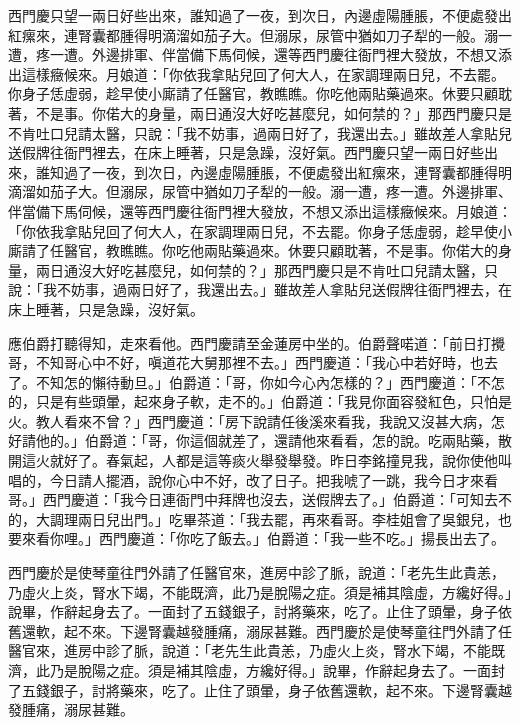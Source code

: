 西門慶只望一兩日好些出來，誰知過了一夜，到次日，內邊虛陽腫脹，不便處發出紅瘰來，連腎囊都腫得明滴溜如茄子大。但溺尿，尿管中猶如刀子犁的一般。溺一遭，疼一遭。外邊排軍、伴當備下馬伺候，還等西門慶往衙門裡大發放，不想又添出這樣癥候來。月娘道：「你依我拿貼兒回了何大人，在家調理兩日兒，不去罷。你身子恁虛弱，趁早使小廝請了任醫官，教瞧瞧。你吃他兩貼藥過來。休要只顧耽著，不是事。你偌大的身量，兩日通沒大好吃甚麼兒，如何禁的？」那西門慶只是不肯吐口兒請太醫，只說：「我不妨事，過兩日好了，我還出去。」雖故差人拿貼兒送假牌往衙門裡去，在床上睡著，只是急躁，沒好氣。西門慶只望一兩日好些出來，誰知過了一夜，到次日，內邊虛陽腫脹，不便處發出紅瘰來，連腎囊都腫得明滴溜如茄子大。但溺尿，尿管中猶如刀子犁的一般。溺一遭，疼一遭。外邊排軍、伴當備下馬伺候，還等西門慶往衙門裡大發放，不想又添出這樣癥候來。月娘道：「你依我拿貼兒回了何大人，在家調理兩日兒，不去罷。你身子恁虛弱，趁早使小廝請了任醫官，教瞧瞧。你吃他兩貼藥過來。休要只顧耽著，不是事。你偌大的身量，兩日通沒大好吃甚麼兒，如何禁的？」那西門慶只是不肯吐口兒請太醫，只說：「我不妨事，過兩日好了，我還出去。」雖故差人拿貼兒送假牌往衙門裡去，在床上睡著，只是急躁，沒好氣。

應伯爵打聽得知，走來看他。西門慶請至金蓮房中坐的。伯爵聲喏道：「前日打攪哥，不知哥心中不好，嗔道花大舅那裡不去。」西門慶道：「我心中若好時，也去了。不知怎的懶待動旦。」伯爵道：「哥，你如今心內怎樣的？」西門慶道：「不怎的，只是有些頭暈，起來身子軟，走不的。」伯爵道：「我見你面容發紅色，只怕是火。教人看來不曾？」西門慶道：「房下說請任後溪來看我，我說又沒甚大病，怎好請他的。」伯爵道：「哥，你這個就差了，還請他來看看，怎的說。吃兩貼藥，散開這火就好了。春氣起，人都是這等痰火舉發舉發。昨日李銘撞見我，說你使他叫唱的，今日請人擺酒，說你心中不好，改了日子。把我唬了一跳，我今日才來看哥。」西門慶道：「我今日連衙門中拜牌也沒去，送假牌去了。」伯爵道：「可知去不的，大調理兩日兒出門。」吃畢茶道：「我去罷，再來看哥。李桂姐會了吳銀兒，也要來看你哩。」西門慶道：「你吃了飯去。」伯爵道：「我一些不吃。」揚長出去了。

西門慶於是使琴童往門外請了任醫官來，進房中診了脈，說道：「老先生此貴恙，乃虛火上炎，腎水下竭，不能既濟，此乃是脫陽之症。須是補其陰虛，方纔好得。」說畢，作辭起身去了。一面封了五錢銀子，討將藥來，吃了。止住了頭暈，身子依舊還軟，起不來。下邊腎囊越發腫痛，溺尿甚難。西門慶於是使琴童往門外請了任醫官來，進房中診了脈，說道：「老先生此貴恙，乃虛火上炎，腎水下竭，不能既濟，此乃是脫陽之症。須是補其陰虛，方纔好得。」說畢，作辭起身去了。一面封了五錢銀子，討將藥來，吃了。止住了頭暈，身子依舊還軟，起不來。下邊腎囊越發腫痛，溺尿甚難。

